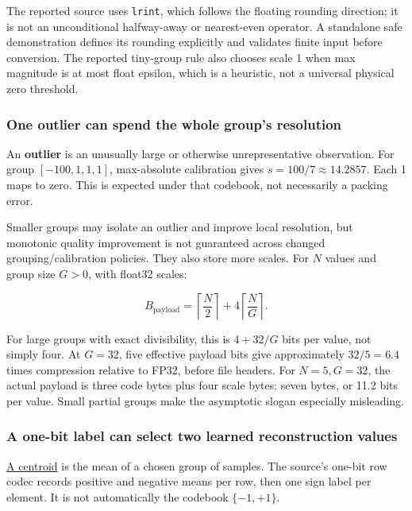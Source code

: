 The reported source uses \texttt{lrint}, which follows the floating rounding direction; it is not an unconditional halfway-away or nearest-even operator. A standalone safe demonstration defines its rounding explicitly and validates finite input before conversion. The reported tiny-group rule also chooses scale 1 when max magnitude is at most float epsilon, which is a heuristic, not a universal physical zero threshold.

\subsubsection{One outlier can spend the whole group's resolution}\label{05-engine-i-ch001-one-outlier-can-spend-the-whole-groups-resolution}

An \textbf{outlier} is an unusually large or otherwise unrepresentative observation. For group \([-100,1,1,1]\), max-absolute calibration gives \(s=100/7\approx14.2857\). Each 1 maps to zero. This is expected under that codebook, not necessarily a packing error.

Smaller groups may isolate an outlier and improve local resolution, but monotonic quality improvement is not guaranteed across changed grouping/calibration policies. They also store more scales. For \(N\) values and group size \(G>0\), with float32 scales:

\[
B_{\mathrm{payload}}=
\left\lceil\frac N2\right\rceil
+4\left\lceil\frac NG\right\rceil.
\]

For large groups with exact divisibility, this is \(4+32/G\) bits per value, not simply four. At \(G=32\), five effective payload bits give approximately \(32/5=6.4\) times compression relative to FP32, before file headers. For \(N=5,G=32\), the actual payload is three code bytes plus four scale bytes: seven bytes, or 11.2 bits per value. Small partial groups make the asymptotic slogan especially misleading.

\subsubsection{A one-bit label can select two learned reconstruction values}\label{05-engine-i-ch001-a-one-bit-label-can-select-two-learned-reconstruction-values}

\hyperref[appendix-4ccd7a775813]{A centroid} is the mean of a chosen group of samples. The source's one-bit row codec records positive and negative means per row, then one sign label per element. It is not automatically the codebook \(\{-1,+1\}\).

